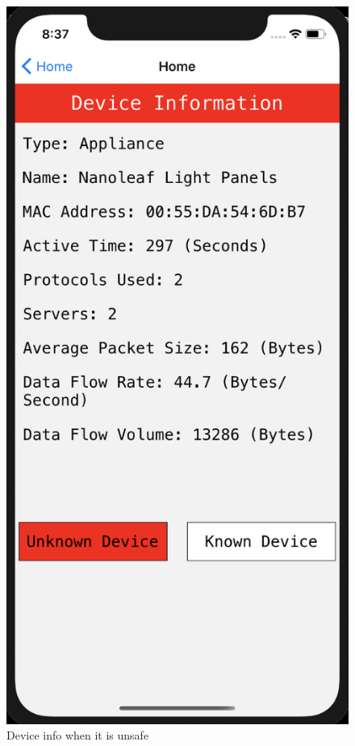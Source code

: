 \documentclass{article}
\begin{document}
\begin{figure}[hbtp]
    \centering
    \includegraphics[scale=0.65]{frontEnd/deviceInfoUnsafe.png}
    \caption{Device info when it is unsafe} 
\end{figure}
\pagebreak
\end{document}
